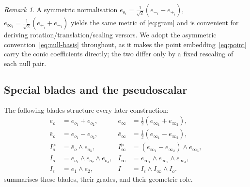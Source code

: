 \documentclass{birkjour}
\theoremstyle{definition}
\theoremstyle{remark}
\newtheorem{remark}[theorem]{Remark}
\newcommand{\eo}{e_o}
\newcommand{\einf}{e_\infty}
\newcommand{\eobar}{\bar e_o}
\newcommand{\einfbar}{\bar e_\infty}
\newcommand{\Iod}{I_o^{\triangleright}}      %
\newcommand{\Iinfd}{I_\infty^{\triangleright}}%
\newcommand{\Io}{I_o}
\newcommand{\Iinf}{I_\infty}
\newcommand{\joinp}{\wedge}
\begin{document}
\begin{remark}
A symmetric normalisation $e_{o_i}=\tfrac{1}{\sqrt2}(e_{-_i}-e_{+_i})$,
$e_{\infty_i}=\tfrac{1}{\sqrt2}(e_{+_i}+e_{-_i})$ yields the same metric of
\cref{eq:gram} and is convenient for deriving rotation/translation/scaling
versors. We adopt the asymmetric convention~\eqref{eq:null-basis} throughout, as
it makes the point embedding~\eqref{eq:point} carry the conic coefficients
directly; the two differ only by a fixed rescaling of each null pair.
\end{remark}

\subsection{Special blades and the pseudoscalar}
The following blades structure every later construction:
\begin{subequations}\label{eq:special-blades}
\begin{align}
  \eo &= e_{o_1}+e_{o_2}, & \einf &= \tfrac12(e_{\infty_1}+e_{\infty_2}),\\
  \eobar &= e_{o_1}-e_{o_2}, & \einfbar &= \tfrac12(e_{\infty_1}-e_{\infty_2}),\\
  \Iod &= \eobar \joinp e_{o_3}, & \Iinfd &= (e_{\infty_1}-e_{\infty_2})\joinp e_{\infty_3},\\
  \Io &= e_{o_1}\joinp e_{o_2}\joinp e_{o_3}, & \Iinf &= e_{\infty_1}\joinp e_{\infty_2}\joinp e_{\infty_3},\\
  I_\epsilon &= e_1\joinp e_2, & I &= I_\epsilon \joinp \Iinf \joinp \Io .
\end{align}
\end{subequations}
 summarises these blades, their grades, and their geometric role.
\end{document}
